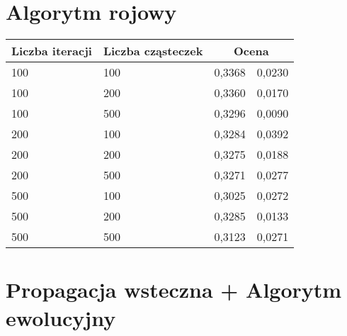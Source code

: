 \documentclass[11pt,a4paper,oneside]{report}
\begin{document}
\section{Algorytm rojowy}

\begin{center}
	\begin{longtable}{|l|l|r@{$\pm$}r|}
		\hline
		Liczba iteracji & Liczba cząsteczek & \multicolumn{2}{|c|}{Ocena}\\ \hline \hline\endhead
		100 & 100 & 0,3368 & 0,0230\\ \hline
		100 & 200 & 0,3360 & 0,0170\\ \hline
		100 & 500 & 0,3296 & 0,0090\\ \hline
		200 & 100 & 0,3284 & 0,0392\\ \hline
		200 & 200 & 0,3275 & 0,0188\\ \hline
		200 & 500 & 0,3271 & 0,0277\\ \hline
		500 & 100 & 0,3025 & 0,0272\\ \hline
		500 & 200 & 0,3285 & 0,0133\\ \hline
		500 & 500 & 0,3123 & 0,0271\\ \hline
	\end{longtable}
\end{center}

\section{Propagacja wsteczna + Algorytm ewolucyjny}
\end{document}
